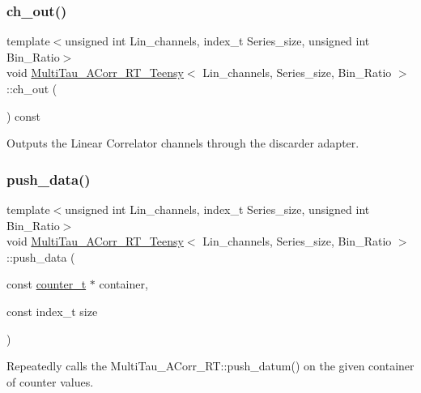 \subsubsection{\texorpdfstring{ch\+\_\+out()}{ch\_out()}}
{\footnotesize\ttfamily template$<$unsigned int Lin\+\_\+channels, index\+\_\+t Series\+\_\+size, unsigned int Bin\+\_\+\+Ratio$>$ \\
void \hyperlink{classMultiTau__ACorr__RT__Teensy}{Multi\+Tau\+\_\+\+A\+Corr\+\_\+\+R\+T\+\_\+\+Teensy}$<$ Lin\+\_\+channels, Series\+\_\+size, Bin\+\_\+\+Ratio $>$\+::ch\+\_\+out (\begin{DoxyParamCaption}{ }\end{DoxyParamCaption}) const\hspace{0.3cm}{\ttfamily [inline]}}



Outputs the Linear Correlator channels through the discarder adapter. 

\mbox{\label{classMultiTau__ACorr__RT__Teensy_ae36ab4fb6f646d068e638ab7e4ec9da8}} 
\subsubsection{\texorpdfstring{push\+\_\+data()}{push\_data()}}
{\footnotesize\ttfamily template$<$unsigned int Lin\+\_\+channels, index\+\_\+t Series\+\_\+size, unsigned int Bin\+\_\+\+Ratio$>$ \\
void \hyperlink{classMultiTau__ACorr__RT__Teensy}{Multi\+Tau\+\_\+\+A\+Corr\+\_\+\+R\+T\+\_\+\+Teensy}$<$ Lin\+\_\+channels, Series\+\_\+size, Bin\+\_\+\+Ratio $>$\+::push\+\_\+data (\begin{DoxyParamCaption}\item[{const \hyperlink{types_8hpp_a22f279793847eba127de149437848c48}{counter\+\_\+t} $\ast$}]{container,  }\item[{const index\+\_\+t}]{size }\end{DoxyParamCaption})\hspace{0.3cm}{\ttfamily [inline]}}



Repeatedly calls the Multi\+Tau\+\_\+\+A\+Corr\+\_\+\+R\+T\+::push\+\_\+datum() on the given container of counter values. 

